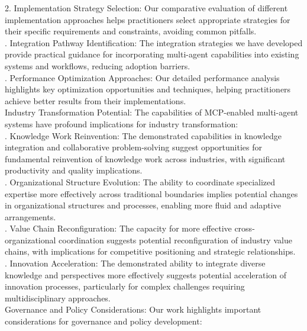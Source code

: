 2. Implementation Strategy Selection: Our comparative evaluation of different implementation approaches helps practitioners select appropriate strategies for their specific requirements and constraints, avoiding common pitfalls.\\ . Integration Pathway Identification: The integration strategies we have developed provide practical guidance for incorporating multi-agent capabilities into existing systems and workflows, reducing adoption barriers.\\ . Performance Optimization Approaches: Our detailed performance analysis highlights key optimization opportunities and techniques, helping practitioners achieve better results from their implementations.\\ \newline
Industry Transformation Potential: The capabilities of MCP-enabled multi-agent systems have profound implications for industry transformation:\\ . Knowledge Work Reinvention: The demonstrated capabilities in knowledge integration and collaborative problem-solving suggest opportunities for fundamental reinvention of knowledge work across industries, with significant productivity and quality implications.\\ . Organizational Structure Evolution: The ability to coordinate specialized expertise more effectively across traditional boundaries implies potential changes in organizational structures and processes, enabling more fluid and adaptive arrangements.\\ . Value Chain Reconfiguration: The capacity for more effective cross-organizational coordination suggests potential reconfiguration of industry value chains, with implications for competitive positioning and strategic relationships.\\ . Innovation Acceleration: The demonstrated ability to integrate diverse knowledge and perspectives more effectively suggests potential acceleration of innovation processes, particularly for complex challenges requiring multidisciplinary approaches.\\ \newline
Governance and Policy Considerations: Our work highlights important considerations for governance and policy development:\\ \newline
